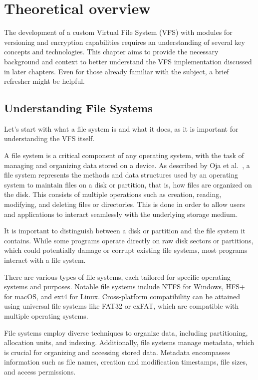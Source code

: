 \chapter{Theoretical overview}
\label{chap:refs}

The development of a custom Virtual File System (VFS) with modules for versioning and encryption capabilities requires an understanding of several key concepts and technologies.
This chapter aims to provide the necessary background and context to better understand the VFS implementation discussed in later chapters.
Even for those already familiar with the subject, a brief refresher might be helpful.


\section{Understanding File Systems}\label{sec:file-systems}

Let's start with what a file system is and what it does, as it is important for understanding the VFS itself.

A file system is a critical component of any operating system, with the task of managing and organizing data stored on a device.
As described by Oja et al.~\cite{oja-fs}, a file system represents the methods and data structures used by an operating system to maintain files on a disk or partition, that is, how files are organized on the disk.
This consists of multiple operations such as creation, reading, modifying, and deleting files or directories.
This is done in order to allow users and applications to interact seamlessly with the underlying storage medium.

It is important to distinguish between a disk or partition and the file system it contains.
While some programs operate directly on raw disk sectors or partitions, which could potentially damage or corrupt existing file systems, most programs interact with a file system.

There are various types of file systems, each tailored for specific operating systems and purposes.
Notable file systems include NTFS for Windows, HFS+ for macOS, and ext4 for Linux.
Cross-platform compatibility can be attained using universal file systems like FAT32 or exFAT, which are compatible with multiple operating systems.

File systems employ diverse techniques to organize data, including partitioning, allocation units, and indexing.
Additionally, file systems manage metadata, which is crucial for organizing and accessing stored data.
Metadata encompasses information such as file names, creation and modification timestamps, file sizes, and access permissions.


